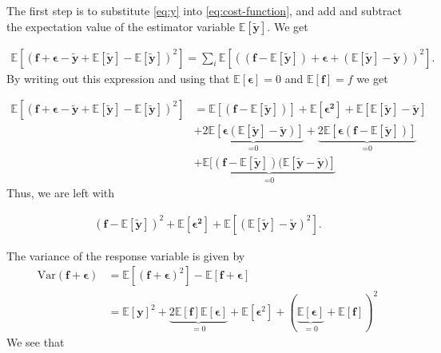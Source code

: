 \documentclass[../main.tex]{subfiles}
\begin{document}
The first step is to substitute \cref{eq:y} into \cref{eq:cost-function}, and add and subtract the expectation value of the estimator variable \ensuremath{\mathbb{E}[\mathbf{\tilde{y}}]}. We get 

\begin{align}
    \mathbb{E}\left[(\mathbf{f}+\mathbf{\epsilon}-\mathbf{\tilde{y}}+\mathbb{E}[\mathbf{\tilde{y}}]-\mathbb{E}[\mathbf{\tilde{y}}])^2\right] = \sum_{i}\mathbb{E}\left[((\mathbf{f}-\mathbb{E}[\mathbf{\tilde{y}}])+\mathbf{\epsilon}+(\mathbb{E}[\mathbf{\tilde{y}}]-\mathbf{\tilde{y}}))^2\right]. 
\end{align} By writing out this expression and using that \ensuremath{\mathbb{E}[\mathbf{\epsilon}]=0} and \ensuremath{\mathbb{E}[\mathbf{f}]=f} we get

\begin{align*}
    \mathbb{E}\left[(\mathbf{f}+\mathbf{\epsilon}-\mathbf{\tilde{y}}+\mathbb{E}[\mathbf{\tilde{y}}]-\mathbb{E}[\mathbf{\tilde{y}}])^2\right] &= 
    \mathbb{E}[(\mathbf{f}-\mathbb{E}[\mathbf{\tilde{y}}])]+\mathbb{E}[\mathbf{\epsilon^2}]+\mathbb{E}[\mathbb{E}[\mathbf{\tilde{y}}]-\mathbf{\tilde{y}}]\\&+\underbrace{2\mathbb{E}[\boldsymbol{\epsilon}(\mathbb{E}[\mathbf{\tilde{y}}]-\mathbf{\tilde{y}})]}_{\text{=0}}+\underbrace{2\mathbb{E}[\boldsymbol{\epsilon}(\mathbf{f}-\mathbb{E}[\mathbf{\tilde{y}}])]}_{\text{=0}}\\&+\underbrace{\mathbb{E}[(\mathbf{f}-\mathbb{E}[\mathbf{\tilde{y}}])(\mathbb{E}[\mathbf{\tilde{y}}-\mathbf{\tilde{y}})]}_{\text{=0}}
\end{align*} Thus, we are left with 

\begin{align*}
    (\mathbf{f}-\mathbb{E}[\mathbf{\tilde{y}}])^2+\mathbb{E}[\boldsymbol{\epsilon^2}]+\mathbb{E}[(\mathbb{E}[\mathbf{\tilde{y}}]-\mathbf{\tilde{y}})^2].
\end{align*}

The variance of the response variable is given by
\begin{align*}
    \mathrm{Var}(\mathbf{f}+\boldsymbol{\epsilon})&=\mathbb{E}[(\mathbf{f}+\boldsymbol{\epsilon})^2]-\mathbb{E}[\mathbf{f}+\boldsymbol{\epsilon}]\\&=\mathbb{E}[\mathbf{y}]^2+\underbrace{2\mathbb{E}[\mathbf{f}]\mathbb{E}[\boldsymbol{\epsilon}]}_{=0}+\mathbb{E}[\boldsymbol{\epsilon}^2]+(\underbrace{\mathbb{E}[\boldsymbol{\epsilon}]}_{=0}+\mathbb{E}[\mathbf{f}])^2
\end{align*} We see that 
\end{document}
